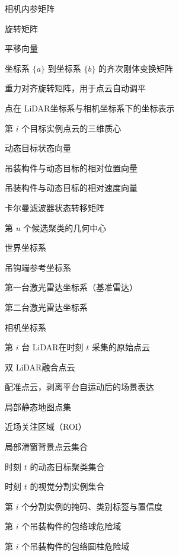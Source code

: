 
\item[{{$\mathbf{K}$}}] 相机内参矩阵
\item[{{$\mathbf{R}$}}] 旋转矩阵
\item[{{$\mathbf{t}$}}] 平移向量
\item[{{$\mathbf{T}_{a}^{b}$}}] 坐标系 $\{a\}$ 到坐标系 $\{b\}$ 的齐次刚体变换矩阵
\item[{{$\mathbf{R}_{\mathrm{level}}$}}] 重力对齐旋转矩阵，用于点云自动调平
\item[{{$\mathbf{p}_L,\mathbf{p}_C$}}] 点在 LiDAR坐标系与相机坐标系下的坐标表示
\item[{{$\bar{\mathbf{p}}_i$}}] 第 $i$ 个目标实例点云的三维质心
\item[{{$\mathbf{x}(t)$}}] 动态目标状态向量
\item[{{$\mathbf{r}(t)$}}] 吊装构件与动态目标的相对位置向量
\item[{{$\mathbf{v}_{\mathrm{rel}}(t)$}}] 吊装构件与动态目标的相对速度向量
\item[{{$\mathbf{F}(\Delta t)$}}] 卡尔曼滤波器状态转移矩阵
\item[{{$\mathbf{c}_u$}}] 第 $u$ 个候选聚类的几何中心
\item[{{$\{w\}$}}] 世界坐标系
\item[{{$\{h\}$}}] 吊钩端参考坐标系
\item[{{$\{l_1\}$}}] 第一台激光雷达坐标系（基准雷达）
\item[{{$\{l_2\}$}}] 第二台激光雷达坐标系
\item[{{$\{c\}$}}] 相机坐标系
\item[{{$\mathcal{P}_{l_i}(t)$}}] 第 $i$ 台 LiDAR在时刻 $t$ 采集的原始点云
\item[{{$\mathcal{P}_f(t)$}}] 双 LiDAR融合点云
\item[{{$\mathcal{P}_{\mathrm{reg}}$}}] 配准点云，剥离平台自运动后的场景表达
\item[{{$\mathcal{M}_{\mathrm{local}}$}}] 局部静态地图点集
\item[{{$\Omega$}}] 近场关注区域（ROI）
\item[{{$\mathcal{B}(t)$}}] 局部滑窗背景点云集合
\item[{{$\mathcal{C}_t$}}] 时刻 $t$ 的动态目标聚类集合
\item[{{$\mathcal{S}_t$}}] 时刻 $t$ 的视觉分割实例集合
\item[{{$M_i,c_i,s_i$}}] 第 $i$ 个分割实例的掩码、类别标签与置信度
\item[{{$\mathcal{S}_i$}}] 第 $i$ 个吊装构件的包络球危险域
\item[{{$\mathcal{C}_i$}}] 第 $i$ 个吊装构件的包络圆柱危险域
